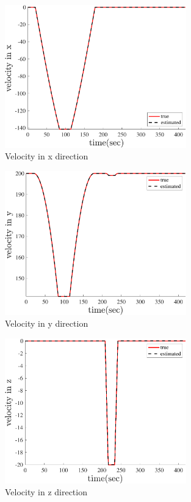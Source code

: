 \begin{figure}[H]
    \centering
    \includegraphics[width=0.7\textwidth]{../Figure/Q5/velocity_x}
    \caption{Velocity in x direction}
\end{figure}
\begin{figure}[H]
    \centering
    \includegraphics[width=0.7\textwidth]{../Figure/Q5/velocity_y}
    \caption{Velocity in y direction}
\end{figure}
\begin{figure}[H]
    \centering
    \includegraphics[width=0.7\textwidth]{../Figure/Q5/velocity_z}
    \caption{Velocity in z direction}
\end{figure}

